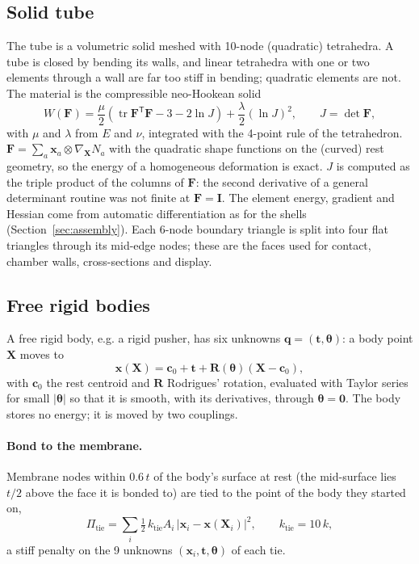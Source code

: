\documentclass[11pt,a4paper]{article}
\theoremstyle{remark}
\begin{document}
\subsection{Solid tube}
The tube is a volumetric solid meshed with 10-node (quadratic) tetrahedra. A tube is closed by
bending its walls, and linear tetrahedra with one or two elements through a wall are far too stiff
in bending; quadratic elements are not. The material is the compressible neo-Hookean
solid~\cite{bonet2008}
\begin{equation}
  W(\bm F) = \frac{\mu}{2}\left(\operatorname{tr}\bm F^{\mathsf T}\bm F - 3 - 2\ln J\right)
           + \frac{\lambda}{2}(\ln J)^2,\qquad J=\det\bm F,
\end{equation}
with $\mu$ and $\lambda$ from $E$ and $\nu$, integrated with the 4-point rule of the tetrahedron.
$\bm F = \sum_a \bm x_a \otimes \nabla_{\bm X} N_a$ with the quadratic shape functions on the
(curved) rest geometry, so the energy of a homogeneous deformation is exact. $J$ is computed as the
triple product of the columns of $\bm F$: the second derivative of a general determinant routine
was not finite at $\bm F=\bm I$. The element energy, gradient and Hessian come from automatic
differentiation as for the shells (Section~\ref{sec:assembly}). Each 6-node boundary triangle is
split into four flat triangles through its mid-edge nodes; these are the faces used for contact,
chamber walls, cross-sections and display.

\subsection{Free rigid bodies}
A free rigid body, e.g. a rigid pusher, has six unknowns $\bm q = (\bm t, \bm\theta)$: a body point $\bm X$
moves to
\begin{equation}
  \bm x(\bm X) = \bm c_0 + \bm t + \bm R(\bm\theta)(\bm X - \bm c_0),
\end{equation}
with $\bm c_0$ the rest centroid and $\bm R$ Rodrigues' rotation, evaluated with Taylor series for
small $|\bm\theta|$ so that it is smooth, with its derivatives, through $\bm\theta=\bm 0$. The body
stores no energy; it is moved by two couplings.

\paragraph{Bond to the membrane.} Membrane nodes within $0.6\,t$ of the body's surface at rest
(the mid-surface lies $t/2$ above the face it is bonded to) are tied to the point of the body they
started on,
\begin{equation}
  \Pi_\mathrm{tie} = \sum_i \tfrac12\, k_\mathrm{tie} A_i\,\bigl|\bm x_i - \bm x(\bm X_i)\bigr|^2,
  \qquad k_\mathrm{tie} = 10\,k,
\end{equation}
a stiff penalty on the 9 unknowns $(\bm x_i, \bm t, \bm\theta)$ of each tie.
\end{document}
